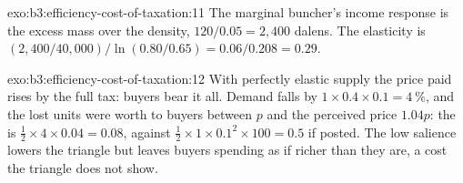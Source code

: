 \begin{solution}{exo:b3:efficiency-cost-of-taxation:11}
The marginal buncher's income response is the excess mass over the density, $120/0.05 =
2{,}400$ dalens. The elasticity is $(2{,}400/40{,}000)/\ln(0.80/0.65) = 0.06/0.208 = 0.29$.
\end{solution}

\begin{solution}{exo:b3:efficiency-cost-of-taxation:12}
With perfectly elastic supply the price paid rises by the full tax: buyers bear it
all. Demand falls by $1 \times 0.4 \times 0.1 = 4~\%$, and the lost units were worth to buyers between $p$
and the perceived price $1.04p$: the  is $\tfrac12 \times 4 \times 0.04 = 0.08$, against $\tfrac12 \times 1 \times 0.1^2 \times 100 =
0.5$ if posted. The low salience lowers the triangle but leaves buyers spending as if
richer than they are, a cost the triangle does not show.
\end{solution}

